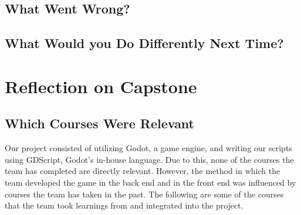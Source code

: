\documentclass{article}
\begin{document}
\subsection{What Went Wrong?}


\subsection{What Would you Do Differently Next Time?}


\section{Reflection on Capstone}


\subsection{Which Courses Were Relevant}


Our project consisted of utilizing Godot, a game engine, and writing our scripts using GDScript, Godot's in-house language. Due to this, none of the courses the team has completed are directly relevant. However, the method in which the team developed the game in the back end and in the front end was influenced by courses the team has taken in the past. The following are some of the courses that the team took learnings from and integrated into the project. 
\end{document}
